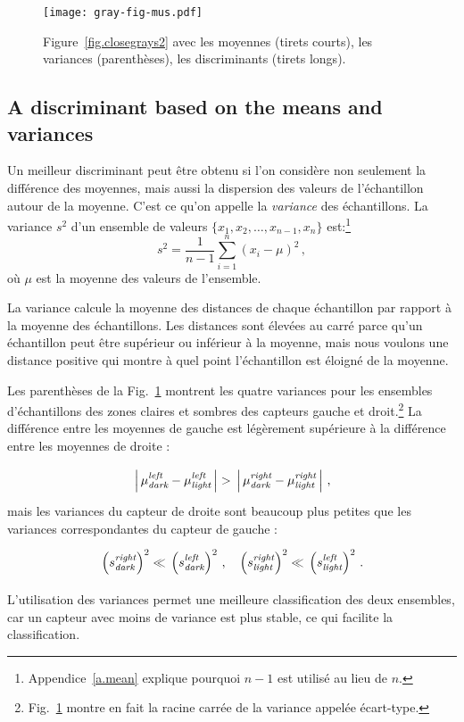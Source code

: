 \begin{figure}
\begin{center}
\texttt{[image: gray-fig-mus.pdf]}
\end{center}
\caption{Figure~\ref{fig.closegrays2} avec les moyennes (tirets courts), les variances (parenthèses), les discriminants (tirets longs).}\label{fig.closegraysmus}
\end{figure}

\subsection{A discriminant based on the means and variances}

Un meilleur discriminant peut être obtenu si l'on considère non seulement la différence des moyennes, mais aussi la dispersion des valeurs de l'échantillon autour de la moyenne. C'est ce qu'on appelle la \emph{variance} des échantillons. La variance $s^2$ d'un ensemble de valeurs $\{x_1,x_2,\ldots,x_{n-1},x_n\}$ est:\footnote{Appendice~\ref{a.mean} explique pourquoi $n-1$ est utilisé au lieu de $n$.}
\[
s^2 = \frac{1}{n-1} \sum_{i=1}^n (x_i-\mu)^2\,,
\]
où $\mu$ est la moyenne des valeurs de l'ensemble.

La variance calcule la moyenne des distances de chaque échantillon par rapport à la moyenne des échantillons. Les distances sont élevées au carré parce qu'un échantillon peut être supérieur ou inférieur à la moyenne, mais nous voulons une distance positive qui montre à quel point l'échantillon est éloigné de la moyenne.

Les parenthèses de la Fig.~\ref{fig.closegraysmus} montrent les quatre variances pour les ensembles d'échantillons des zones claires et sombres des capteurs gauche et droit.\footnote{Fig.~\ref{fig.closegraysmus} montre en fait la racine carrée de la variance appelée écart-type.} La différence entre les moyennes de gauche est légèrement supérieure à la différence entre les moyennes de droite :
\[
\rule[-2ex]{0pt}{6ex}\left|\,\mu_{\sub{dark}}^{\sub{left}}-\mu_{\sub{light}}^{\sub{left}}\,\right| > \rule[-2ex]{0pt}{6ex}\left|\,\mu_{\sub{dark}}^{\sub{right}}-\mu_{\sub{light}}^{\sub{right}}\,\right|\,,
\]
mais les variances du capteur de droite sont beaucoup plus petites que les variances correspondantes du capteur de gauche :
\[
\rule[-2ex]{0pt}{6ex}\left(s_{\sub{dark}}^{\sub{right}}\right)^2
\ll
\rule[-3ex]{0pt}{6ex}\left(s_{\sub{dark}}^{\sub{left}}\right)^2\,,\;\;\;
\rule[-2ex]{0pt}{6ex}\left(s_{\sub{light}}^{\sub{right}}\right)^2
\ll
\rule[-3ex]{0pt}{6ex}\left(s_{\sub{light}}^{\sub{left}}\right)^2\,.
\]
L'utilisation des variances permet une meilleure classification des deux ensembles, car un capteur avec moins de variance est plus stable, ce qui facilite la classification.


